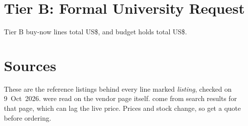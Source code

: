 \documentclass[final]{dbfdoc}
\begin{document}
\clearpage
\section{Tier B: Formal University Request}
Tier B buy-now lines total US\$\prTotalBbuy, and budget holds total US\$\prTotalBhold.


\section{Sources}
These are the reference listings behind every line marked \emph{listing}, checked on 9~Oct~2026. \prListedPage{} were read on the vendor page itself. \prListedSearch{} come from search results for that page, which can lag the live price. Prices and stock change, so get a quote before ordering.

\end{document}
